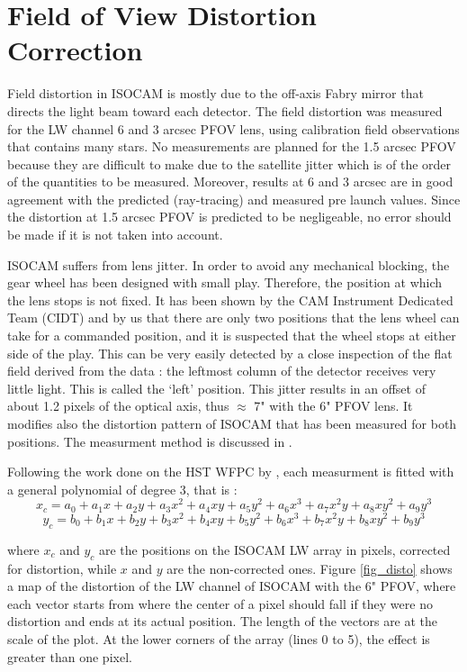 \section{Field of View Distortion Correction}
  Field distortion in ISOCAM is mostly due to the off-axis Fabry mirror 
that directs the light beam toward each detector. The field distortion 
was measured for the  LW channel 6 and 3 arcsec PFOV lens, using calibration field observations that contains many stars. No measurements are planned for the 1.5 arcsec PFOV 
because they are difficult to make due to the satellite jitter which is of 
the order of the quantities to be measured. Moreover, results at 6 
and 3 arcsec are in good agreement with the predicted (ray-tracing) 
and measured pre launch values. Since the distortion at 1.5 arcsec 
PFOV is predicted to be negligeable, 
no error should be made if it is not taken into account.

 ISOCAM suffers from lens jitter. In order to avoid any 
mechanical blocking, the gear wheel has been designed with small 
play.  Therefore, the position at which the lens stops is not fixed.  It has been 
shown by the CAM Instrument Dedicated Team (CIDT) and by us that there 
are only two positions that the lens wheel can take for a commanded 
position, and it is suspected that the wheel stops at either side of 
the play.  This can be very easily detected by a close inspection of 
the flat field derived from the data : the leftmost column of the 
detector receives very little light.  This is called the `left' position.  
This jitter results in an offset of about 1.2 pixels of the optical 
axis, thus $\approx$ 7" with the 6" PFOV lens. It modifies also the 
distortion pattern of ISOCAM that has been measured for both 
positions. The measurment method is discussed in \cite{starck:aussel98}. 

Following the work done on the HST WFPC by \cite{iso:holtzman95},  each 
measurment is fitted with a general polynomial of degree 3, that is :
\begin{equation}
x_{c} = a_{0}+ a_{1}x + a_{2} y + a_{3}x^{2}+ a_{4}x y + a_{5}y^{2} + 
a_{6}x^{3}+ a_{7}x^{2}y + a_{8}xy^{2}+ a_{9}y^{3} 
\end{equation}
\begin{equation}
y_{c} = b_{0}+ b_{1}x + b_{2} y + b_{3}x^{2}+ b_{4}x y + b_{5}y^{2} + 
b_{6}x^{3}+ b_{7}x^{2}y + b_{8}xy^{2}+ b_{9}y^{3} 
\end{equation}

where $x_{c}$ and $y_{c}$ are the positions on the ISOCAM LW array in 
pixels, corrected for distortion, while $x$ and $y$ are the non-corrected ones. Figure \ref{fig_disto} shows a map of the 
distortion of the LW channel of ISOCAM with the 6" PFOV, where each vector starts from 
where the center of a pixel should fall if they were no distortion and 
ends at its actual position.  The length of the vectors are at the 
scale of the plot. At the lower corners of the array (lines 0 to 5), 
the effect is greater than one pixel.  

